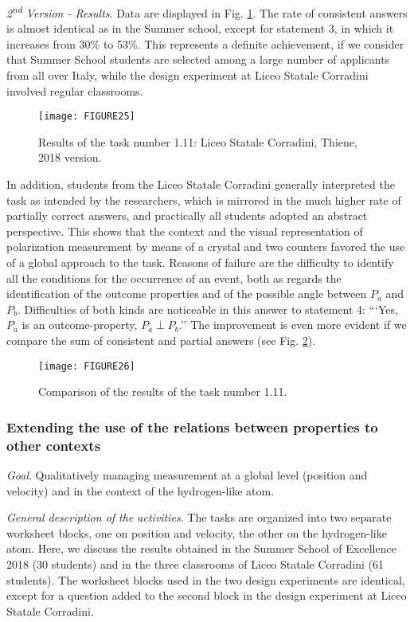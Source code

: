 \documentclass[twocolumn,secnumarabic,amssymb, nobibnotes, aps, prd, nofootinbib]{revtex4-2}
\begin{document}
\emph{2\textsuperscript{nd} Version - Results}. Data are displayed in Fig. \ref{FIG:25}. The rate of consistent answers is almost identical as in the Summer school, except for statement 3, in which it increases from 30\% to 53\%. This represents a definite achievement, if we consider that Summer School students are selected among a large number of applicants from all over Italy, while the design experiment at Liceo Statale Corradini involved regular classrooms.
\begin{figure}[!htpb]
       \texttt{[image: FIGURE25]}
    \caption{Results of the task number 1.11: Liceo Statale Corradini, Thiene, 2018 version.}
    \label{FIG:25}
\end{figure}
In addition, students from the Liceo Statale Corradini generally interpreted the task as intended by the researchers, which is mirrored in the much higher rate of partially correct answers, and practically all students adopted an abstract perspective. This shows that the context and the visual representation of polarization measurement by means of a crystal and two counters favored the use of a global approach to the task. Reasons of failure are the difficulty to identify all the conditions for the occurrence of an event, both as regards the identification of the outcome properties and of the possible angle between $P_a$ and $P_b$. Difficulties of both kinds are noticeable in this answer to statement 4: ```Yes, $P_a$ is an outcome-property, $P_a \perp P_b$.'' The improvement is even more evident if we compare the sum of consistent and partial answers (see Fig. \ref{FIG:26}).
\begin{figure}[!htpb]
       \texttt{[image: FIGURE26]}
    \caption{Comparison of the results of the task number 1.11.}
    \label{FIG:26}
\end{figure}

\subsubsection{Extending the use of the relations between properties to other contexts} \label{Sec:5.3.2}
\emph{Goal}. Qualitatively managing measurement at a global level (position and velocity) and in the context of the hydrogen-like atom.

\emph{General description of the activities}. The tasks are organized into two separate worksheet blocks, one on position and velocity, the other on the hydrogen-like atom. Here, we discuss the results obtained in the Summer School of Excellence 2018 (30 students) and in the three classrooms of Liceo Statale Corradini (61 students). The worksheet blocks used in the two design experiments are identical, except for a question added to the second block in the design experiment at Liceo Statale Corradini.
\end{document}
